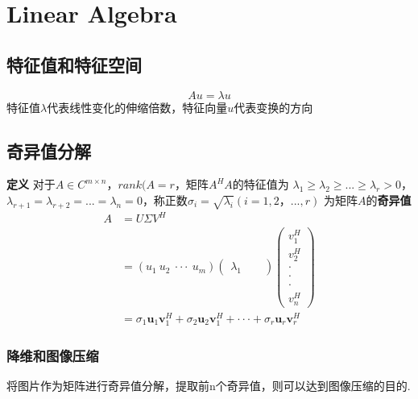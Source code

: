 \chapter{Linear Algebra}

\section{特征值和特征空间}
\begin{equation}
    Au = \lambda u
\end{equation}
特征值$\lambda$代表线性变化的伸缩倍数，特征向量$u$代表变换的方向

\section{奇异值分解}
\textbf{定义} 对于$A \in C^{m \times n}$，$rank(A = r$，矩阵$A^HA$的特征值为
$\lambda_1 \geqslant \lambda_2 \geqslant ... \geqslant \lambda_r > 0$，
$\lambda_{r+1} = \lambda_{r+2} = ... = \lambda_{n} = 0$，称正数$\sigma_i = \sqrt{\lambda_i}(i = 1,2，...,r) $
为矩阵$A$的\textbf{奇异值}
\\
\begin{equation}
    \begin{split}
        A
        &= U \Sigma V^H \\
        &= (u_1\ u_2\ \cdot \cdot \cdot\ u_m)
        \begin{pmatrix}
            \lambda_1 &  &
        \end{pmatrix}
        \begin{pmatrix}
            v_1^H \\
            v_2^H \\
            \cdot \\
            \cdot \\
            \cdot \\
            v_n^H
        \end{pmatrix}
        \\
        &= \sigma_1 \boldsymbol{u}_1 \boldsymbol{v}_1^H + \sigma_2 \boldsymbol{u}_2 \boldsymbol{v}_1^H + \cdot\cdot\cdot + \sigma_r \boldsymbol{u}_r \boldsymbol{v}_r^H
    \end{split}
\end{equation}

\subsection{降维和图像压缩}
将图片作为矩阵进行奇异值分解，提取前n个奇异值，则可以达到图像压缩的目的.